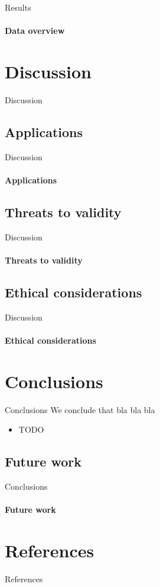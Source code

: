 \documentclass[xcolor={dvipsnames,table},12pt]{beamer}
\newif\ifplacelogo{}  %
\begin{document}
\placelogofalse{}
\begin{frame}{Results}
    \framesubtitle{Data overview}
    {
        \tiny
        
    }
\end{frame}
\placelogotrue{}

\section{Discussion}
\begin{frame}{Discussion}
\end{frame}

\subsection*{Applications}
\begin{frame}{Discussion}
    \framesubtitle{Applications}
\end{frame}

\subsection*{Threats to validity}
\begin{frame}{Discussion}
    \framesubtitle{Threats to validity}
\end{frame}

\subsection*{Ethical considerations}
\begin{frame}{Discussion}
    \framesubtitle{Ethical considerations}
\end{frame}

\section{Conclusions}
\begin{frame}{Conclusions}
    We conclude that bla bla bla

    \begin{itemize}
        \item TODO
    \end{itemize}
\end{frame}

\subsection{Future work}
\begin{frame}{Conclusions}
    \framesubtitle{Future work}
\end{frame}

\section*{References}
\begin{frame}[allowframebreaks]{References}
    \AtNextBibliography{\scriptsize}
    \printbibliography[category=cited]
\end{frame}
\end{document}
